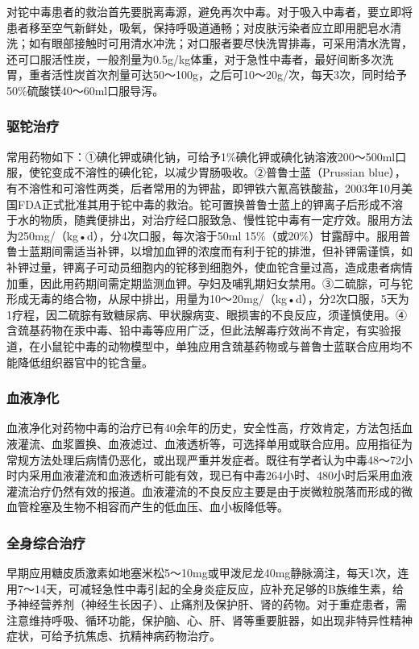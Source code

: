 对铊中毒患者的救治首先要脱离毒源，避免再次中毒。对于吸入中毒者，要立即将患者移至空气新鲜处，吸氧，保持呼吸道通畅；对皮肤污染者应立即用肥皂水清洗；如有眼部接触时可用清水冲洗；对口服者要尽快洗胃排毒，可采用清水洗胃，还可口服活性炭，一般剂量为0.5g/kg体重，对于急性中毒者，最好间断多次洗胃，重者活性炭首次剂量可达50～100g，之后可10～20g/次，每天3次，同时给予50\%硫酸镁40～60ml口服导泻。

\subsubsection{驱铊治疗}

常用药物如下：①碘化钾或碘化钠，可给予1\%碘化钾或碘化钠溶液200～500ml口服，使铊变成不溶性的碘化铊，以减少胃肠吸收。②普鲁士蓝（Prussian
blue），有不溶性和可溶性两类，后者常用的为钾盐，即钾铁六氰高铁酸盐，2003年10月美国FDA正式批准其用于铊中毒的救治。铊可置换普鲁士蓝上的钾离子后形成不溶于水的物质，随粪便排出，对治疗经口服致急、慢性铊中毒有一定疗效。服用方法为250mg/（kg•d），分4次口服，每次溶于50ml
15\%（或20\%）甘露醇中。服用普鲁士蓝期间需适当补钾，以增加血钾的浓度而有利于铊的排泄，但补钾需谨慎，如补钾过量，钾离子可动员细胞内的铊移到细胞外，使血铊含量过高，造成患者病情加重，因此用药期间需定期监测血钾。孕妇及哺乳期妇女禁用。③二硫腙，可与铊形成无毒的络合物，从尿中排出，用量为10～20mg/（kg•d），分2次口服，5天为1疗程，因二硫腙有致糖尿病、甲状腺病变、眼损害的不良反应，须谨慎使用。④含巯基药物在汞中毒、铅中毒等应用广泛，但此法解毒疗效尚不肯定，有实验报道，在小鼠铊中毒的动物模型中，单独应用含巯基药物或与普鲁士蓝联合应用均不能降低组织器官中的铊含量。

\subsubsection{血液净化}

血液净化对药物中毒的治疗已有40余年的历史，安全性高，疗效肯定，方法包括血液灌流、血浆置换、血液滤过、血液透析等，可选择单用或联合应用。应用指征为常规方法处理后病情仍恶化，或出现严重并发症者。既往有学者认为中毒48～72小时内采用血液灌流和血液透析可能有效，现已有中毒264小时、480小时后采用血液灌流治疗仍然有效的报道。血液灌流的不良反应主要是由于炭微粒脱落而形成的微血管栓塞及生物不相容而产生的低血压、血小板降低等。

\subsubsection{全身综合治疗}

早期应用糖皮质激素如地塞米松5～10mg或甲泼尼龙40mg静脉滴注，每天1次，连用7～14天，可减轻急性中毒引起的全身炎症反应，应补充足够的B族维生素，给予神经营养剂（神经生长因子）、止痛剂及保护肝、肾的药物。对于重症患者，需注意维持呼吸、循环功能，保护脑、心、肝、肾等重要脏器，如出现非特异性精神症状，可给予抗焦虑、抗精神病药物治疗。


